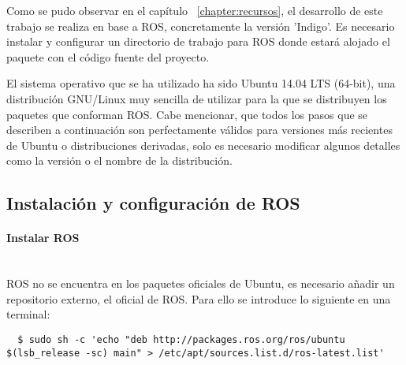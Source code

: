 

Como se pudo observar en el capítulo ~\ref{chapter:recursos}, el desarrollo de
este trabajo se realiza en base a ROS, concretamente la versión 'Indigo'. Es
necesario instalar y configurar un directorio de trabajo para ROS donde estará
alojado el paquete con el código fuente del proyecto.

El sistema operativo que se ha utilizado ha sido Ubuntu 14.04 LTS (64-bit), una
distribución GNU/Linux muy sencilla de utilizar para la que se distribuyen los
paquetes que conforman ROS. Cabe mencionar, que todos los pasos que se
describen a continuación son perfectamente válidos para versiones más recientes
de Ubuntu o distribuciones derivadas, solo es necesario modificar algunos
detalles como la versión o el nombre de la distribución. 

\subsection{Instalación y configuración de ROS}

\paragraph{Instalar ROS} \hspace{0pt} \\
ROS no se encuentra en los paquetes oficiales de Ubuntu, es necesario añadir un
repositorio externo, el oficial de ROS. Para ello se introduce lo siguiente en
una terminal:
\\
\begin{lstlisting}
  $ sudo sh -c 'echo "deb http://packages.ros.org/ros/ubuntu $(lsb_release -sc) main" > /etc/apt/sources.list.d/ros-latest.list'
\end{lstlisting}


